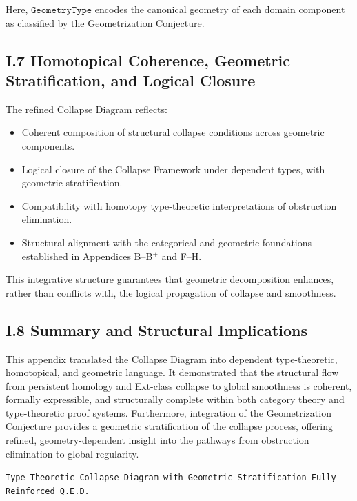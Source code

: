\documentclass[11pt]{article}
\begin{document}
Here, \( \texttt{GeometryType} \) encodes the canonical geometry of each domain component as classified by the Geometrization Conjecture.

\subsection*{I.7 Homotopical Coherence, Geometric Stratification, and Logical Closure}

The refined Collapse Diagram reflects:

\begin{itemize}
  \item Coherent composition of structural collapse conditions across geometric components.
  \item Logical closure of the Collapse Framework under dependent types, with geometric stratification.
  \item Compatibility with homotopy type-theoretic interpretations of obstruction elimination.
  \item Structural alignment with the categorical and geometric foundations established in Appendices B–B$^+$ and F–H.
\end{itemize}

This integrative structure guarantees that geometric decomposition enhances, rather than conflicts with, the logical propagation of collapse and smoothness.

\subsection*{I.8 Summary and Structural Implications}

This appendix translated the Collapse Diagram into dependent type-theoretic, homotopical, and geometric language.  
It demonstrated that the structural flow from persistent homology and Ext-class collapse to global smoothness is coherent, formally expressible, and structurally complete within both category theory and type-theoretic proof systems.  
Furthermore, integration of the Geometrization Conjecture provides a geometric stratification of the collapse process, offering refined, geometry-dependent insight into the pathways from obstruction elimination to global regularity.

\begin{flushright}
\texttt{Type-Theoretic Collapse Diagram with Geometric Stratification \quad Fully Reinforced \quad Q.E.D.}
\end{flushright}
\end{document}
